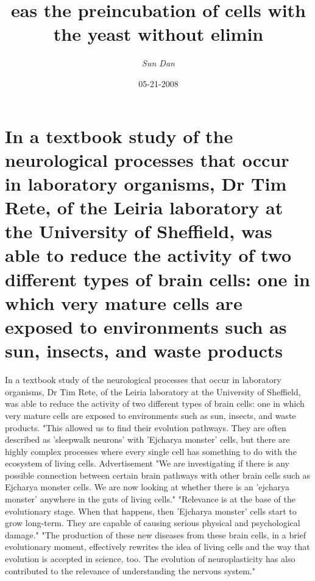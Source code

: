 \documentclass{article}%
\title{eas the preincubation of cells with the yeast without elimin}%
\author{\textit{Sun Dan}}%
\date{05-21-2008}%
\begin{document}
%
\normalsize%
\maketitle%
\section{In a textbook study of the neurological processes that occur in laboratory organisms, Dr Tim Rete, of the Leiria laboratory at the University of Sheffield, was able to reduce the activity of two different types of brain cells: one in which very mature cells are exposed to environments such as sun, insects, and waste products}%
\label{sec:Inatextbookstudyoftheneurologicalprocessesthatoccurinlaboratoryorganisms,DrTimRete,oftheLeirialaboratoryattheUniversityofSheffield,wasabletoreducetheactivityoftwodifferenttypesofbraincellsoneinwhichverymaturecellsareexposedtoenvironmentssuchassun,insects,andwasteproducts}%
In a textbook study of the neurological processes that occur in laboratory organisms, Dr Tim Rete, of the Leiria laboratory at the University of Sheffield, was able to reduce the activity of two different types of brain cells: one in which very mature cells are exposed to environments such as sun, insects, and waste products.\newline%
"This allowed us to find their evolution pathways. They are often described as 'sleepwalk neurons' with 'Ejcharya monster' cells, but there are highly complex processes where every single cell has something to do with the ecosystem of living cells.\newline%
Advertisement\newline%
"We are investigating if there is any possible connection between certain brain pathways with other brain cells such as Ejcharya monster cells. We are now looking at whether there is an 'ejcharya monster' anywhere in the guts of living cells."\newline%
"Relevance is at the base of the evolutionary stage. When that happens, then 'Ejcharya monster' cells start to grow long{-}term. They are capable of causing serious physical and psychological damage."\newline%
"The production of these new diseases from these brain cells, in a brief evolutionary moment, effectively rewrites the idea of living cells and the way that evolution is accepted in science, too. The evolution of neuroplasticity has also contributed to the relevance of understanding the nervous system."\newline%
\end{document}
